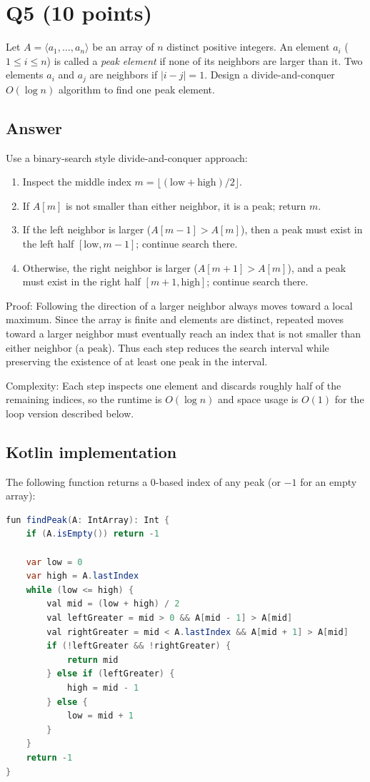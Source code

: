 \documentclass[12pt]{article}
\begin{document}
\section*{Q5 (10 points)}
Let $A = \langle a_1, \dots, a_n \rangle$ be an array of $n$ distinct positive integers. An element $a_i$ ($1 \le i \le n$) is called a \emph{peak element} if none of its neighbors are larger than it. Two elements $a_i$ and $a_j$ are neighbors if $|i-j| = 1$. Design a divide-and-conquer $O(\log n)$ algorithm to find one peak element.

\subsection*{Answer}
Use a binary-search style divide-and-conquer approach:
\begin{enumerate}
  \item Inspect the middle index $m = \lfloor (\text{low} + \text{high})/2 \rfloor$.
  \item If $A[m]$ is not smaller than either neighbor, it is a peak; return $m$.
  \item If the left neighbor is larger ($A[m-1] > A[m]$), then a peak must exist in the left half $[\text{low}, m-1]$; continue search there.
  \item Otherwise, the right neighbor is larger ($A[m+1] > A[m]$), and a peak must exist in the right half $[m+1, \text{high}]$; continue search there.
\end{enumerate}

Proof: Following the direction of a larger neighbor always moves toward a local maximum. Since the array is finite and elements are distinct, repeated moves toward a larger neighbor must eventually reach an index that is not smaller than either neighbor (a peak). Thus each step reduces the search interval while preserving the existence of at least one peak in the interval.

Complexity: Each step inspects one element and discards roughly half of the remaining indices, so the runtime is $O(\log n)$ and space usage is $O(1)$ for the loop version described below.

\subsection*{Kotlin implementation}
The following function returns a 0-based index of any peak (or $-1$ for an empty array):

\begin{lstlisting}[language=Java]
fun findPeak(A: IntArray): Int {
    if (A.isEmpty()) return -1

    var low = 0
    var high = A.lastIndex
    while (low <= high) {
        val mid = (low + high) / 2
        val leftGreater = mid > 0 && A[mid - 1] > A[mid]
        val rightGreater = mid < A.lastIndex && A[mid + 1] > A[mid]
        if (!leftGreater && !rightGreater) {
            return mid
        } else if (leftGreater) {
            high = mid - 1
        } else {
            low = mid + 1
        }
    }
    return -1
}
\end{lstlisting}
\end{document}
